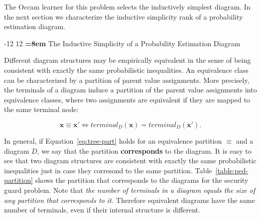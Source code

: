 \documentclass{elsarticle}%
\makeatletter
\renewcommand\section{\@startsection {section}{1}{\z@}%
  {-12\p@ \@plus -4\p@ \@minus -4\p@}%
                       {12\p@ \@plus 4\p@ \@minus 4\p@}%
                                   {\normalfont\large\bfseries\boldmath
                                   \rightskip=\z@ \@plus 8em\pretolerance=10000 }}
\newcommand{\hypothesis}{H}
\newcommand{\tree}{D}
\newcommand{\leaf}{\mathit{terminal}}
\newcommand{\partition}{\equiv}
\newcommand{\parentval}{x}
\newcommand{\parentvals}{\mathbf{\parentval}}
\makeatother
\begin{document}
The Occam learner for this problem selects the inductively simplest diagram. In the next section we characterize the inductive simplicity rank of a probability estimation diagram.

\section{The Inductive Simplicity of a Probability Estimation Diagram} 

Different diagram structures may be empirically equivalent in the sense of being consistent with exactly the same probabilistic inequalities. An equivalence class can be characterized by a partition of parent value assignments. More precisely,
%
the terminals of a diagram induce a partition of the parent value assignments into equivalence classes, where two assignments are equivalent if they are mapped to the same terminal node:

\begin{equation} \label{eq:tree-part}
\parentvals \equiv \parentvals' \iff \leaf_{\tree}(\parentvals) = \leaf_{\tree}(\parentvals'). 
\end{equation}


 
In general, if Equation~\eqref{eq:tree-part}  holds for an equivalence partition $\partition$ and a diagram $\tree$, we say that the partition \textbf{corresponds} to the diagram. It is easy to see that two diagram structures are consistent with exactly the same probabilistic inequalities just in case they corresond to the same partition. Table~\ref{table:ped-partition} shows the partition that corresponds to the diagrams for the security guard problem.
Note that \emph{the number of terminals in a diagram equals the size of any partition that corresponds to it.} Therefore equivalent diagrams have the same number of terminals, even if their internal structure is different. 

\begin{table}[tbp] \centering
{}
\caption{Each of the two diagrams in Figure~\ref{fig:pet} corresponds to the same 4-cell partition of parent assigments, shown in the table.}%
\label{table:ped-partition}
\end{table}
\end{document}
